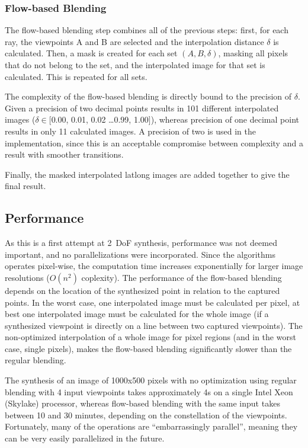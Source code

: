 \subsubsection{Flow-based Blending}
The flow-based blending step combines all of the previous steps: first, for each ray, the viewpoints A and B are selected and the interpolation distance $\delta$ is calculated. Then, a mask is created for each set $(A,B,\delta)$, masking all pixels that do not belong to the set, and the interpolated image for that set is calculated. This is repeated for all sets.

The complexity of the flow-based blending is directly bound to the precision of $\delta$. Given a precision of two decimal points results in 101 different interpolated images ($\delta \in [$0.00, 0.01, 0.02 \ldots 0.99, 1.00$]$), whereas precision of one decimal point results in only 11 calculated images. A precision of two is used in the implementation, since this is an acceptable compromise between complexity and a result with smoother transitions.

Finally, the masked interpolated latlong images are added together to give the final result.

\subsection{Performance}
As this is a first attempt at 2~DoF synthesis, performance was not deemed important, and no parallelizations were incorporated. Since the algorithms operates pixel-wise, the computation time increases exponentially for larger image resolutions ($O(n^2)$ coplexity). The performance of the flow-based blending depends on the location of the synthesized point in relation to the captured points. In the worst case, one interpolated image must be calculated per pixel, at best one interpolated image must be calculated for the whole image (if a synthesized viewpoint is directly on a line between two captured viewpoints). The non-optimized interpolation of a whole image for pixel regions (and in the worst case, single pixels), makes the flow-based blending significantly slower than the regular blending.

The synthesis of an image of 1000x500 pixels with no optimization using regular blending with 4 input viewpoints takes approximately 4s on a single Intel Xeon (Skylake) processor, whereas flow-based blending with the same input takes between 10 and 30 minutes, depending on the constellation of the viewpoints.
Fortunately, many of the operations are ``embarrassingly parallel'', meaning they can be very easily parallelized in the future.

